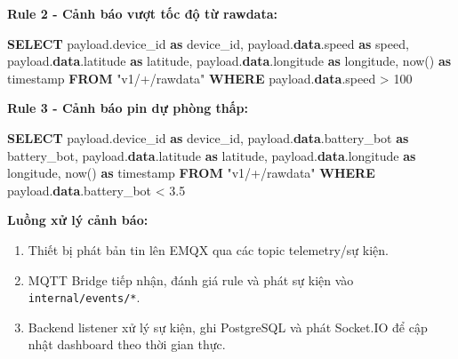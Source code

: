\documentclass[a4paper]{extarticle}
\newenvironment{Shaded}{}{}
\newcommand{\DataTypeTok}[1]{\textcolor[rgb]{0.56,0.13,0.00}{#1}}
\newcommand{\DecValTok}[1]{\textcolor[rgb]{0.25,0.63,0.44}{#1}}
\newcommand{\FloatTok}[1]{\textcolor[rgb]{0.25,0.63,0.44}{#1}}
\newcommand{\KeywordTok}[1]{\textcolor[rgb]{0.00,0.44,0.13}{\textbf{#1}}}
\newcommand{\NormalTok}[1]{#1}
\newcommand{\OperatorTok}[1]{\textcolor[rgb]{0.40,0.40,0.40}{#1}}
\newcommand{\OtherTok}[1]{\textcolor[rgb]{0.00,0.44,0.13}{#1}}
\providecommand{\tightlist}{%
  \setlength{\itemsep}{0pt}\setlength{\parskip}{0pt}}
\begin{document}
\textbf{Rule 2 - Cảnh báo vượt tốc độ từ rawdata:}

\begin{Shaded}
\begin{Highlighting}[]
\KeywordTok{SELECT}
\NormalTok{  payload.device\_id }\KeywordTok{as}\NormalTok{ device\_id,}
\NormalTok{  payload.}\KeywordTok{data}\NormalTok{.speed }\KeywordTok{as}\NormalTok{ speed,}
\NormalTok{  payload.}\KeywordTok{data}\NormalTok{.latitude }\KeywordTok{as}\NormalTok{ latitude,}
\NormalTok{  payload.}\KeywordTok{data}\NormalTok{.longitude }\KeywordTok{as}\NormalTok{ longitude,}
\NormalTok{  now() }\KeywordTok{as} \DataTypeTok{timestamp}
\KeywordTok{FROM} \OtherTok{"v1/+/rawdata"}
\KeywordTok{WHERE}\NormalTok{ payload.}\KeywordTok{data}\NormalTok{.speed }\OperatorTok{\textgreater{}} \DecValTok{100}
\end{Highlighting}
\end{Shaded}

\textbf{Rule 3 - Cảnh báo pin dự phòng thấp:}

\begin{Shaded}
\begin{Highlighting}[]
\KeywordTok{SELECT}
\NormalTok{  payload.device\_id }\KeywordTok{as}\NormalTok{ device\_id,}
\NormalTok{  payload.}\KeywordTok{data}\NormalTok{.battery\_bot }\KeywordTok{as}\NormalTok{ battery\_bot,}
\NormalTok{  payload.}\KeywordTok{data}\NormalTok{.latitude }\KeywordTok{as}\NormalTok{ latitude,}
\NormalTok{  payload.}\KeywordTok{data}\NormalTok{.longitude }\KeywordTok{as}\NormalTok{ longitude,}
\NormalTok{  now() }\KeywordTok{as} \DataTypeTok{timestamp}
\KeywordTok{FROM} \OtherTok{"v1/+/rawdata"}
\KeywordTok{WHERE}\NormalTok{ payload.}\KeywordTok{data}\NormalTok{.battery\_bot }\OperatorTok{\textless{}} \FloatTok{3.5}
\end{Highlighting}
\end{Shaded}

\textbf{Luồng xử lý cảnh báo:}

\begin{enumerate}
\tightlist
\item
  Thiết bị phát bản tin lên EMQX qua các topic telemetry/sự kiện.
\item
  MQTT Bridge tiếp nhận, đánh giá rule và phát sự kiện vào
  \texttt{internal/events/*}.
\item
  Backend listener xử lý sự kiện, ghi PostgreSQL và phát Socket.IO để cập
  nhật dashboard theo thời gian thực.
\end{enumerate}
\end{document}
